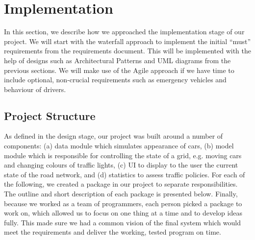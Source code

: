 \documentclass{article}
\begin{document}

\section{Implementation}
	In this section, we describe how we approached the implementation stage of our project. 
	We will start with the waterfall approach to implement the initial ``must'' requirements from the requirements document. This will be implemented with the help of designs such as Architectural Patterns and UML diagrams from the previous sections. We will make use of the Agile approach if we have time to include optional, non-crucial requirements such as emergency vehicles and behaviour of drivers. 
	
	
	\subsection{Project Structure}
	As defined in the design stage, our project was built around a number of components: (a) data module which simulates appearance of cars, (b) model module which is responsible for controlling the state of a grid, e.g. moving cars and changing colours of traffic lights, (c) UI to display to the user the current state of the road network, and (d) statistics to assess traffic policies. 
	For each of the following, we created a package in our project to separate responsibilities. 
	The outline and short description of each package is presented below. Finally, because we worked as a team of programmers, each person picked a package to work on, which allowed us to focus on one thing at a time and to develop ideas fully. This made sure we had a common vision of the final system which would meet the requirements and deliver the working, tested program on time. 
	
\end{document}
